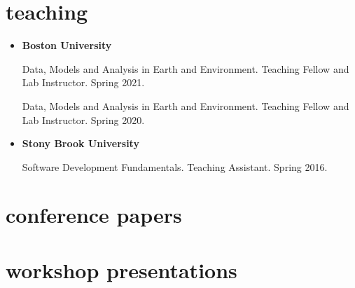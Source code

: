 \documentclass[10pt,oneside]{article}
\begin{document}

\section{teaching}

\mbox{}\vspace{-\dimexpr\baselineskip\relax}


\begin{itemize}[label={}]
  
  \item \textbf{Boston University}
        
        Data, Models and Analysis in Earth and Environment. Teaching Fellow and Lab Instructor. Spring 2021.
        
        Data, Models and Analysis in Earth and Environment. Teaching Fellow and Lab Instructor. Spring 2020.
        
        
  \item \textbf{Stony Brook University}
        
        Software Development Fundamentals. Teaching Assistant. Spring 2016.
        
        
\end{itemize}

\section{conference papers}

\mbox{}\vspace{-\dimexpr\baselineskip\relax}
\vspace*{-1em}
\printbibliography[type=inproceedings, heading=none]


\section{workshop presentations}

\mbox{}\vspace{-\dimexpr\baselineskip\relax}
\end{document}
